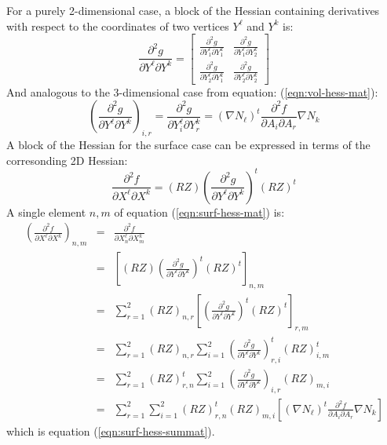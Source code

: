 \documentclass{report}
\begin{document}
\noindent For a purely 2-dimensional case, a block of the Hessian containing 
derivatives with respect to the coordinates of two vertices $Y^\ell$ and $Y^k$ is:
\begin{equation} \label{eqn:hess-2d}
\frac{\partial^2 g}{\partial Y^\ell \partial Y^k} =
\left[ \begin{array}{cc}
\frac{\partial^2 g}{\partial Y^\ell_1 \partial Y^k_1} &
\frac{\partial^2 g}{\partial Y^\ell_1 \partial Y^k_2} \\
\frac{\partial^2 g}{\partial Y^\ell_2 \partial Y^k_1} &
\frac{\partial^2 g}{\partial Y^\ell_2 \partial Y^k_2} 
\end{array} \right] \end{equation}
\noindent And analogous to the 3-dimensional case from equation:
(\ref{eqn:vol-hess-mat}):
\begin{equation}
\left(\frac{\partial^2 g}{\partial Y^\ell \partial Y^k}\right)_{i,r}
= \frac{\partial^2 g}{\partial Y^\ell_i \partial Y^k_r}
= (\nabla N_\ell)^t \frac{\partial^2 f}{\partial A_i \partial A_r} \nabla N_k
\end{equation}
\noindent A block of the Hessian for the surface case can be expressed in terms of the corresonding 2D Hessian:
\begin{equation} \label{eqn:surf-hess-mat}
\frac{\partial^2 f}{\partial X^\ell \partial X^k}
= (RZ) \left(\frac{\partial^2 g}{\partial Y^\ell \partial Y^k}\right)^t (RZ)^t
\end{equation}
\noindent A single element $n,m$ of equation (\ref{eqn:surf-hess-mat}) is:
\begin{eqnarray}
\left(\frac{\partial^2 f}{\partial X^\ell \partial X^k}\right)_{n,m}
&=& \frac{\partial^2 f}{\partial X^\ell_n \partial X^k_m} \nonumber \\
&=& \left[(RZ) \left(\frac{\partial^2 g}{\partial Y^\ell \partial Y^k} \right)^t  (RZ)^t\right]_{n,m} 
    \nonumber \\
&=& \sum_{r=1}^2 (RZ)_{n,r} \left[ \left(\frac{\partial^2 g}{\partial Y^\ell \partial Y^k} \right)^t
    (RZ)^t \right]_{r,m} \nonumber \\
&=& \sum_{r=1}^2 (RZ)_{n,r} \sum_{i=1}^2 
    \left(\frac{\partial^2 g}{\partial Y^\ell \partial Y^k}\right)^t_{r,i} (RZ)^t_{i,m} 
    \nonumber \\
&=& \sum_{r=1}^2 (RZ)^t_{r,n} \sum_{i=1}^2 
    \left(\frac{\partial^2 g}{\partial Y^\ell \partial Y^k}\right)_{i,r} (RZ)_{m,i} 
    \nonumber \\
&=& \sum_{r=1}^2 \sum_{i=1}^2 (RZ)^t_{r,n} (RZ)_{m,i} \left[
    (\nabla N_\ell)^t \frac{\partial^2 f}{\partial A_i \partial A_r} \nabla N_k
    \right] \nonumber
\end{eqnarray}
\noindent which is equation (\ref{eqn:surf-hess-summat}). \newline
\end{document}
